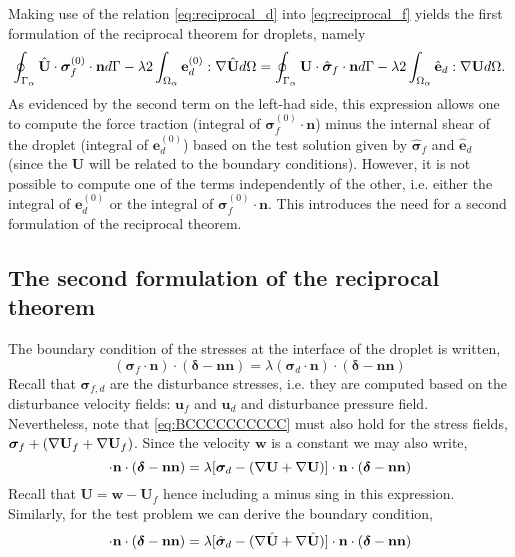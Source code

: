 Making use of the relation \ref{eq:reciprocal_d} into \ref{eq:reciprocal_f} yields the first formulation of the reciprocal theorem for droplets, namely  
\begin{equation}
    \intS{\hat{\textbf{U}}\cdot  \bm\sigma_f^{(0)} \cdot \textbf{n}}
    - \lambda 2\intO{\textbf{e}_d^{(0)} : \grad \hat{\textbf{U}}}
    = 
    \intS{\textbf{U}\cdot  \hat{\bm\sigma}_f \cdot \textbf{n}}
    -\lambda  2\intO{\hat{\textbf{e}}_d : \grad \textbf{U}}. 
    \label{eq:reciprocal_all}
\end{equation}
As evidenced by the second term on the left-had side, this expression  allows one to compute the force traction (integral of $\bm\sigma_f^{(0)} \cdot \textbf{n}$) minus the internal shear of the droplet (integral of $\textbf{e}_d^{(0)}$) based on the test solution given by $\hat{\bm\sigma}_f$ and $\hat{\textbf{e}}_d$ (since the \textbf{U} will be related to the boundary conditions).
However, it is not possible to compute one of the terms independently of the other, i.e. either the integral of $\textbf{e}_d^{(0)}$ or the integral of $\bm\sigma_f^{(0)} \cdot \textbf{n}$. 
This introduces the need for a second formulation of the reciprocal theorem. 

\subsection{The second formulation of the reciprocal theorem}
The boundary condition of the stresses at the interface of the droplet is written,
\begin{equation}
    (\bm\sigma_f\cdot\textbf{n})\cdot (\bm\delta - \textbf{nn})
    = \lambda (\bm\sigma_d\cdot \textbf{n})\cdot (\bm\delta - \textbf{nn})
    \label{eq:BCCCCCCCCCC}
\end{equation}
Recall that $\bm\sigma_{f,d}$ are the disturbance stresses, i.e. they are computed based on the disturbance velocity fields: $\textbf{u}_f$ and $\textbf{u}_d$ and disturbance pressure field. 
Nevertheless, note that \ref{eq:BCCCCCCCCCC} must also hold for the  stress fields, $\bm\sigma_f+ (\mathbf{\nabla} \textbf{U}_f+\mathbf{\nabla} \textbf{U}_f)$.
Since the velocity $\textbf{w}$ is a constant we may also write,
\begin{equation}
    [\bm\sigma_f
    - (\grad \textbf{U}+\grad \textbf{U})
    ]\cdot \textbf{n}\cdot  (\bm\delta - \textbf{nn})
    = 
    \lambda [\bm\sigma_d
    - (\grad \textbf{U}+\grad \textbf{U})
    ]\cdot \textbf{n}\cdot (\bm\delta - \textbf{nn})
    \label{eq:BCCCCCCCCCC2}
\end{equation}
Recall that $\textbf{U} = \textbf{w} - \textbf{U}_f$ hence including a minus sing in this expression. 
Similarly, for the test problem we can derive the boundary condition, 
\begin{equation}
    [\hat{\bm\sigma}_f
    - (\grad \hat{\textbf{U}}+\grad \hat{\textbf{U}})
    ]\cdot \textbf{n}\cdot  (\bm\delta - \textbf{nn})
    = 
    \lambda [\hat{\bm\sigma}_d
    - (\grad \hat{\textbf{U}}+\grad \hat{\textbf{U}})
    ]\cdot \textbf{n}\cdot (\bm\delta - \textbf{nn})
    \label{eq:BCCCCCCCCCC3}
\end{equation}

